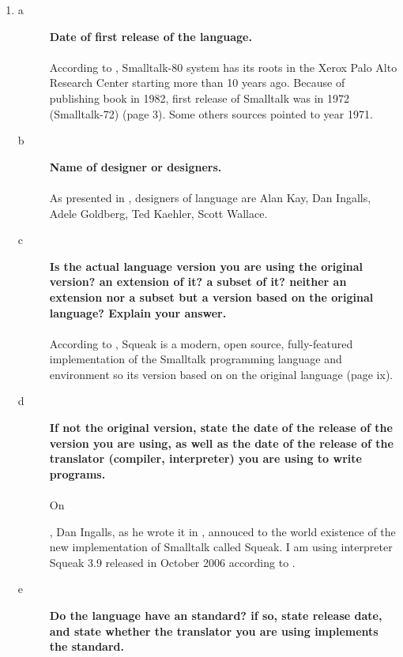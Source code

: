 \documentclass[5pt]{article}
\begin{document}
\maketitle


\begin{enumerate}
  \item
  \begin{description}
  \item[a]\textbf{Date of first release of the language.}\\
  \\
  According to \cite{krasner:bits_of_history}, Smalltalk-80 system has its roots in the Xerox Palo Alto Research
Center starting more than 10 years ago. Because of publishing book in 1982,
first release of Smalltalk was in 1972 (Smalltalk-72) (page 3). Some others
sources pointed to year 1971.
  \item[b]\textbf{Name of designer or designers.}\\
  \\
  As presented in \cite{wiki:smalltalk}, designers of language are Alan Kay, Dan
  Ingalls, Adele Goldberg, Ted Kaehler, Scott Wallace.
  \item[c]\textbf{Is the actual language version you are using the original
  version? an extension of it? a subset of it? neither an extension nor a subset but a version based on the original language? Explain
your answer.}\\
\\
According to \cite{black:squeak_by_example}, Squeak is a modern,
open source, fully-featured implementation of the Smalltalk programming language and environment so its version based on on the
original language (page ix).
  \item[d]\textbf{If not the original version, state the date of the release of
  the version you are using, as well as the date of the release of the
  translator (compiler, interpreter) you are using to write programs.}\\
  \\
  On \date{October 1 1996}, Dan Ingalls, as he wrote it in
  \cite{ignalls:report}, annouced to the world existence of the new
  implementation of Smalltalk called Squeak. I am using interpreter Squeak 3.9
  released in October 2006 according to \cite{web:squeak}.
  \item[e]\textbf{Do the language have an standard? if so, state release date,
  and state whether the translator you are using implements the standard.}\\
  \\

\end{description}
\end{enumerate}
\end{document}
